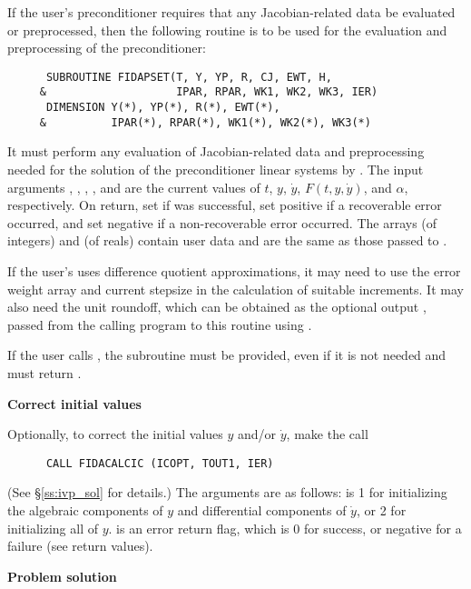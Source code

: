 \begin{Steps}
  If the user's preconditioner requires that any Jacobian-related data be evaluated
  or preprocessed, then the following routine is to be used for the evaluation and 
  preprocessing of the preconditioner:
\begin{verbatim}
      SUBROUTINE FIDAPSET(T, Y, YP, R, CJ, EWT, H, 
     &                    IPAR, RPAR, WK1, WK2, WK3, IER)
      DIMENSION Y(*), YP(*), R(*), EWT(*), 
     &          IPAR(*), RPAR(*), WK1(*), WK2(*), WK3(*) 
\end{verbatim}
  It must perform any evaluation of Jacobian-related data and preprocessing needed
  for the solution of the preconditioner linear systems by .
  The input arguments , , , , and  are the
  current values of $t$, $y$, $\dot{y}$, $F(t,y,\dot{y})$, and $\alpha$, respectively.
  On return, set  if  was successful, set 
  positive if a recoverable error occurred, and set  negative if a 
  non-recoverable error occurred.
  The arrays  (of integers) and  (of reals) contain user data
  and are the same as those passed to .

  If the user's  uses difference quotient approximations, it
  may need to use the error weight array  and current stepsize 
  in the calculation of suitable increments.  It may also need the unit
  roundoff, which can be obtained as the optional output ,
  passed from the calling program to this routine using .

  {\warn} If the user calls ,
  the subroutine  must be provided, even if it is not needed and
  must return .

\item {\bf Correct initial values}

  Optionally, to correct the initial values $y$ and/or $\dot{y}$, make the call
\begin{verbatim}
      CALL FIDACALCIC (ICOPT, TOUT1, IER)
\end{verbatim}
  (See \S\ref{ss:ivp_sol} for details.)  The arguments are as follows:
   is 1 for initializing the algebraic components of $y$ and
  differential components of $\dot{y}$, or 2 for initializing all of $y$.
   is an error return flag, which is 0 for success, or negative
  for a failure (see  return values).

\item {\bf Problem solution}


\end{Steps}
